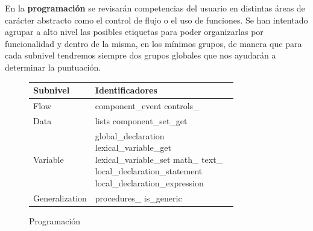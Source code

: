 \documentclass[a4paper, 12pt]{book}
\begin{document}
En la \textbf{programación} se revisarán competencias del usuario en distintas áreas de carácter abstracto como el control de flujo o el uso de funciones. Se han intentado agrupar a alto nivel las posibles etiquetas para poder organizarlas por funcionalidad y dentro de la misma, en los mínimos grupos, de manera que para cada subnivel tendremos siempre dos grupos globales que nos ayudarán a determinar la puntuación. 
\begin{figure}[H]
	\begin{center}
	    \begin{tabular}{| l | p{0.80\linewidth} | }
	    \hline
	    \textbf{Subnivel} & \textbf{Identificadores} \\ \hline
		Flow & component\_event controls\_ \\ \hline
		Data & lists component\_set\_get \\ \hline
		Variable & global\_declaration lexical\_variable\_get lexical\_variable\_set math\_ text\_ local\_declaration\_statement local\_declaration\_expression \\ \hline
		Generalization & procedures\_ is\_generic \\ \hline
            \end{tabular}
	\end{center}
	\caption{Programación}
	\label{fig:programmingScore}
\end{figure}
\end{document}

